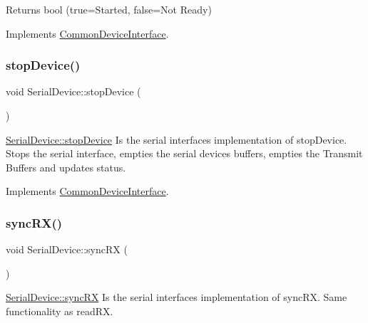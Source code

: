\begin{DoxyReturn}{Returns}
bool (true=Started, false=Not Ready) 
\end{DoxyReturn}


Implements \hyperlink{class_common_device_interface_aa25434f588f2b8e4daa77f57f595d161}{Common\+Device\+Interface}.

\hypertarget{class_serial_device_a55f94898f33ab4674c138fa2cb2e75a1}{}\label{class_serial_device_a55f94898f33ab4674c138fa2cb2e75a1} 
\subsubsection{\texorpdfstring{stop\+Device()}{stopDevice()}}
{\footnotesize\ttfamily void Serial\+Device\+::stop\+Device (\begin{DoxyParamCaption}{ }\end{DoxyParamCaption})\hspace{0.3cm}{\ttfamily [virtual]}}



\hyperlink{class_serial_device_a55f94898f33ab4674c138fa2cb2e75a1}{Serial\+Device\+::stop\+Device} Is the serial interface\textquotesingle{}s implementation of stop\+Device. Stops the serial interface, empties the serial devices buffers, empties the Transmit Buffers and updates status. 



Implements \hyperlink{class_common_device_interface_a53aaf8eee7297f3ee272cc4f366506bf}{Common\+Device\+Interface}.

\hypertarget{class_serial_device_a79c9685f76771703557b2044e941f27a}{}\label{class_serial_device_a79c9685f76771703557b2044e941f27a} 
\subsubsection{\texorpdfstring{sync\+R\+X()}{syncRX()}}
{\footnotesize\ttfamily void Serial\+Device\+::sync\+RX (\begin{DoxyParamCaption}{ }\end{DoxyParamCaption})\hspace{0.3cm}{\ttfamily [virtual]}}



\hyperlink{class_serial_device_a79c9685f76771703557b2044e941f27a}{Serial\+Device\+::sync\+RX} Is the serial interface\textquotesingle{}s implementation of sync\+RX. Same functionality as read\+RX. 



